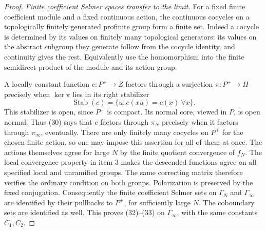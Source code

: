 \begin{proof}
\emph{Finite coefficient Selmer spaces transfer to the limit.}
For a fixed finite coefficient module and a fixed continuous
action, the continuous cocycles on a topologically finitely
generated profinite group form a finite set.
Indeed a cocycle is determined by its values on finitely many
topological generators: its values on the abstract subgroup
they generate follow from the cocycle identity, and continuity
gives the rest.
Equivalently use the homomorphism into the finite semidirect
product of the module and its action group.

A locally constant function $c:P^+\to Z$ factors through a
surjection $\pi:P^+\to H$ precisely when $\ker\pi$ lies in its
right stabilizer
\[
             \operatorname{Stab}(c)
             =\{u:c(xu)=c(x)\ \forall x\}.
\]
This stabilizer is open, since $P^+$ is compact.
Its normal core, viewed in $P$, is open normal.
Thus (30) says that $c$ factors through $\pi_N$ precisely
when it factors through $\pi_\infty$, eventually.
There are only finitely many cocycles on $P^+$ for the chosen
finite action, so one may impose this assertion for all of
them at once.
The actions themselves agree for large $N$ by the finite
quotient convergence of $f_N$.
The local convergence property in item 3 makes the descended
functions agree on all specified local and unramified groups.
The same correcting matrix therefore verifies the ordinary
condition on both groups.
Polarization is preserved by the fixed conjugation.
Consequently the finite coefficient Selmer sets on
$\Gamma_N$ and $\Gamma_\infty$ are identified by their pullbacks
to $P^+$, for sufficiently large $N$.
The coboundary sets are identified as well.
This proves (32)--(33) on $\Gamma_\infty$, with the same
constants $C_1,C_2$.


\end{proof}

